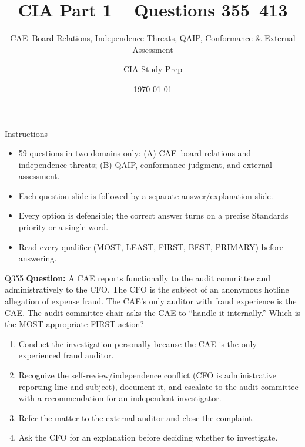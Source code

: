 \documentclass[aspectratio=169,10pt]{beamer}
\title{CIA Part 1 -- Questions 355--413}
\subtitle{CAE--Board Relations, Independence Threats, QAIP, Conformance \& External Assessment}
\author{CIA Study Prep}
\date{\today}
\begin{document}
	
	\begin{frame}
		\titlepage
	\end{frame}
	
	\begin{frame}{Instructions}
		\begin{itemize}
			\item 59 questions in two domains only: (A) CAE--board relations and independence threats; (B) QAIP, conformance judgment, and external assessment.
			\item Each question slide is followed by a separate answer/explanation slide.
			\item Every option is defensible; the correct answer turns on a precise Standards priority or a single word.
			\item Read every qualifier (MOST, LEAST, FIRST, BEST, PRIMARY) before answering.
		\end{itemize}
	\end{frame}
	
	\begin{frame}[t]{Q355}
		\small
		\textbf{Question:} A CAE reports functionally to the audit committee and administratively to the CFO. The CFO is the subject of an anonymous hotline allegation of expense fraud. The CAE's only auditor with fraud experience is the CAE. The audit committee chair asks the CAE to ``handle it internally.'' Which is the MOST appropriate FIRST action?
		\begin{enumerate}[label=\Alph*.,itemsep=1pt,topsep=2pt]
			\item Conduct the investigation personally because the CAE is the only experienced fraud auditor.
			\item Recognize the self-review/independence conflict (CFO is administrative reporting line and subject), document it, and escalate to the audit committee with a recommendation for an independent investigator.
			\item Refer the matter to the external auditor and close the complaint.
			\item Ask the CFO for an explanation before deciding whether to investigate.
		\end{enumerate}
	\end{frame}
	
\end{document}
